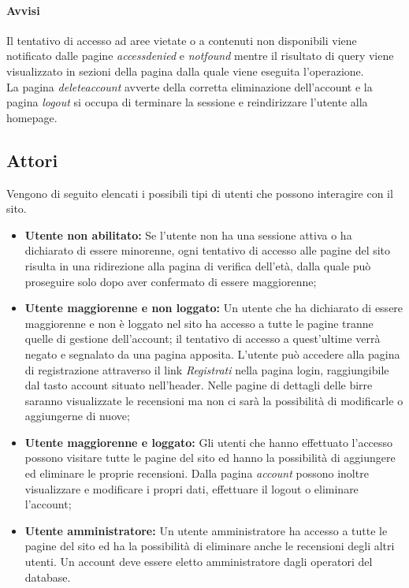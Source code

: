 \paragraph{Avvisi}
Il tentativo di accesso ad aree vietate o a contenuti non disponibili viene notificato dalle pagine \textit{accessdenied} e \textit{notfound} mentre il risultato di query viene visualizzato in sezioni della pagina dalla quale viene eseguita l'operazione.\\
La pagina \textit{deleteaccount} avverte della corretta eliminazione dell'account e la pagina \textit{logout} si occupa di terminare la sessione e reindirizzare l'utente alla homepage.

\subsection{Attori}
Vengono di seguito elencati i possibili tipi di utenti che possono interagire con il sito.
\begin{itemize}
\item \textbf{Utente non abilitato:} Se l'utente non ha una sessione attiva o ha dichiarato di essere minorenne, ogni tentativo di accesso alle pagine del sito risulta in una ridirezione alla pagina di verifica dell'età, dalla quale può proseguire solo dopo aver confermato di essere maggiorenne;
\item \textbf{Utente maggiorenne e non loggato:} Un utente che ha dichiarato di essere maggiorenne e non è loggato nel sito ha accesso a tutte le pagine tranne quelle di gestione dell'account; il tentativo di accesso a quest'ultime verrà negato e segnalato da una pagina apposita.
L'utente può accedere alla pagina di registrazione attraverso il link \textit{Registrati} nella pagina login, raggiungibile dal tasto account situato nell'header.
Nelle pagine di dettagli delle birre saranno visualizzate le recensioni ma non ci sarà la possibilità di modificarle o aggiungerne di nuove;
\item \textbf{Utente maggiorenne e loggato:} Gli utenti che hanno effettuato l'accesso possono visitare tutte le pagine del sito ed hanno la possibilità di aggiungere ed eliminare le proprie recensioni.
Dalla pagina \textit{account} possono inoltre visualizzare e modificare i propri dati, effettuare il logout o eliminare l'account;
\item \textbf{Utente amministratore:} Un utente amministratore ha accesso a tutte le pagine del sito ed ha la possibilità di eliminare anche le recensioni degli altri utenti.
Un account deve essere eletto amministratore dagli operatori del database.
\end{itemize}


